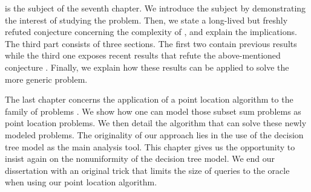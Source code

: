 \threeSUM is the subject of the seventh chapter. We introduce the
subject by demonstrating the interest of studying the \threeSUM problem. Then,
we state a long-lived but freshly refuted conjecture concerning the
complexity of \threeSUM, and explain the implications. The third part
consists of three sections. The first two contain previous results while
the third one exposes recent results that refute the above-mentioned
conjecture \cite{gronlund:2014}. Finally, we explain how these results can be applied to solve
the more generic \kLDT problem.

The last chapter concerns the application of a point location algorithm to the
family of \kSUM problems \cite{meiser:1993,burgisser:1997}. We show how one can
model those subset sum problems as point location problems. We then detail the
algorithm that can solve these newly modeled problems. The originality of our
approach lies in the use of the decision tree model as the main analysis tool.
This chapter gives us the opportunity to insist again on the
nonuniformity of the decision tree model. We end our dissertation with an
original trick that limits the size of queries to the oracle when using our
point location algorithm.
